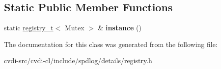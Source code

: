 \subsection*{Static Public Member Functions}
\begin{DoxyCompactItemize}
\item 
static \hyperlink{classspdlog_1_1details_1_1registry__t}{registry\+\_\+t}$<$ Mutex $>$ \& {\bfseries instance} ()\hypertarget{classspdlog_1_1details_1_1registry__t_ad9730643a6d028115fc26937e6085d5c}{}\label{classspdlog_1_1details_1_1registry__t_ad9730643a6d028115fc26937e6085d5c}

\end{DoxyCompactItemize}


The documentation for this class was generated from the following file\+:\begin{DoxyCompactItemize}
\item 
cvdi-\/src/cvdi-\/cl/include/spdlog/details/registry.\+h\end{DoxyCompactItemize}
